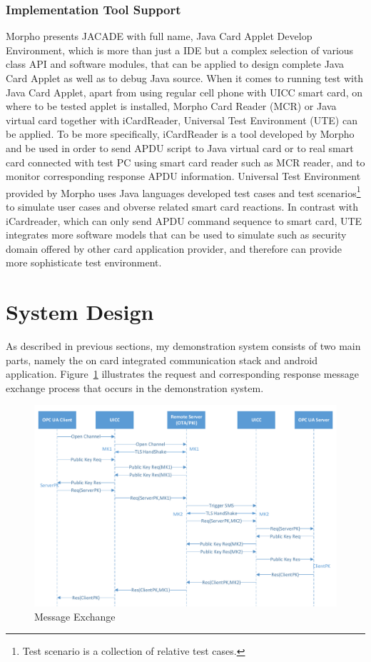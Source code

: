 \documentclass[]{llncs}
\begin{document}
\subsubsection{Implementation Tool Support}
Morpho presents JACADE with full name, Java Card Applet Develop Environment, which is more than just a IDE but a complex selection of various class API and software modules, that can be applied to design complete Java Card Applet as well as to debug Java source. When it comes to running test with Java Card Applet, apart from using regular cell phone with UICC smart card, on where to be tested applet is installed, Morpho Card Reader (MCR) or Java virtual card together with iCardReader, Universal Test Environment (UTE) can be applied. To be more specifically, iCardReader is a tool developed by Morpho and be used in order to send APDU script to Java virtual card or to real smart card connected with test PC using smart card reader such as MCR reader, and to monitor corresponding response APDU information. Universal Test Environment provided by Morpho uses Java languages developed test cases and test scenarios\footnote{Test scenario is a collection of relative test cases.} to simulate user cases and obverse related smart card reactions. In contrast with iCardreader, which can only send APDU command sequence to smart card, UTE integrates more software models that can be used to simulate such as security domain offered by other card application provider, and therefore can provide more sophisticate test environment.


\section{System Design}
As described in previous sections, my demonstration system consists of two main parts, namely the on card integrated  communication stack and android application. Figure~\ref{fig:whole-structure} illustrates the request and corresponding response message exchange  process that occurs in the demonstration system.

\begin{figure}[!htbp]
	\centering
	\includegraphics[width=1.0\textwidth]{whole-structure}
		\caption[ ]{Message Exchange}
	\label{fig:whole-structure}
\end{figure}
\end{document}
